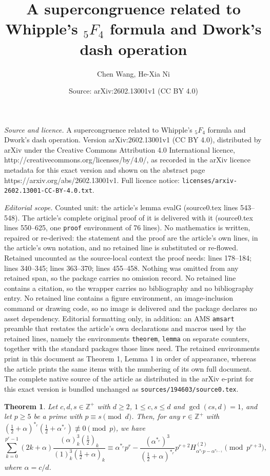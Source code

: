 \documentclass[10pt,a4paper]{amsart}
\title{A supercongruence related to Whipple's ${}_5F_4$ formula and Dwork's dash operation}
\author{Chen Wang, He-Xia Ni}
\date{Source: arXiv:2602.13001v1 (CC BY 4.0)}
\newtheorem{theorem}{Theorem}
\def\Z{\mathbb Z}
\def\eq{\equiv}
\def\f{\frac}
\begin{document}
\maketitle

\noindent\emph{Source and licence.} A supercongruence related to Whipple's ${}_5F_4$ formula and Dwork's dash operation. Version arXiv:2602.13001v1 (CC BY 4.0), distributed by arXiv under the Creative Commons Attribution 4.0 International licence, http://creativecommons.org/licenses/by/4.0/, as recorded in the arXiv licence metadata for this exact version and shown on the abstract page https://arxiv.org/abs/2602.13001v1. Full licence notice: \texttt{licenses/arxiv-2602.13001-CC-BY-4.0.txt}.\par\smallskip

\noindent\textit{Editorial scope.} Counted unit: the article's lemma evalG (source0.tex lines 543--548). The article's complete original proof of it is delivered with it (source0.tex lines 550--625, one \texttt{proof} environment of 76 lines). No mathematics is written, repaired or re-derived: the statement and the proof are the article's own lines, in the article's own notation, and no retained line is substituted or re-flowed.  Retained uncounted as the source-local context the proof needs: lines 178--184; lines 340--345; lines 363--370; lines 455--458.  Nothing was omitted from any retained span, so the package carries no omission record.  No retained line contains a citation, so the wrapper carries no bibliography and no bibliography entry.  No retained line contains a figure environment, an image-inclusion command or drawing code, so no image is delivered and the package declares no asset dependency.  Editorial formatting only, in addition: an AMS \texttt{amsart} preamble that restates the article's own declarations and macros used by the retained lines, namely the environments \texttt{theorem}, \texttt{lemma} on separate counters, together with the standard packages those lines need.  The retained environments print in this document as Theorem 1, Lemma 1 in order of appearance, whereas the article prints the same items with the numbering of its own full document.  The complete native source of the article as distributed in the arXiv e-print for this exact version is bundled unchanged as \texttt{sources/194603/source0.tex}.
\begin{theorem}\label{mainth1}
Let $c,d,s\in\Z^+$ with $d\geq 2$, $1\leq c,s\leq d$ and $\gcd(cs,d)=1$, and let $p\geq5$ be a prime with $p\eq s\pmod d$. Then, for any $r\in\Z^+$ with $(\f12+\alpha)^{\ast_r}(\f12+\alpha^{\ast_r})\not\eq0\pmod{p}$,  we have
\begin{equation}\label{mainth1eq}
\sum_{k=0}^{p^r-1}(2k+\alpha)\f{(\alpha)_k^3(\f12)_k}{(1)_k^3(\f12+\alpha)_k}\eq \alpha^{\ast_r}p^r -\f{(\alpha^{\ast_r})^3}{(\f12+\alpha)^{\ast_r}}p^{r+2}H_{\alpha^{\ast_r}p-\alpha^{\ast_{r-1}}}^{(2)}\pmod{p^{r+3}},
\end{equation}
where $\alpha=c/d$.
\end{theorem}
\end{document}
